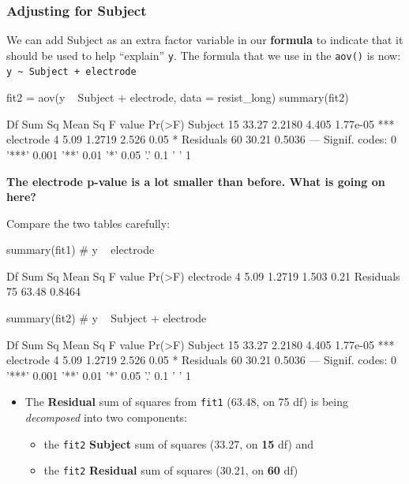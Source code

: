 \documentclass[a4paper]{article}\usepackage[]{graphicx}\usepackage[]{xcolor}
\begin{document}
\subsubsection{Adjusting for \textcolor{myred}{Subject}}
We can add Subject as an extra factor variable in our \textbf{formula} to indicate that it should be used to help ``explain'' \lstinline|y|. The formula that we use in the \lstinline|aov()| is now: \lstinline|y ~ Subject + electrode|
\begin{Schunk}
\begin{Sinput}
fit2 = aov(y ~ Subject + electrode, data = resist_long)
summary(fit2)
\end{Sinput}
\begin{Soutput}
            Df Sum Sq Mean Sq F value   Pr(>F)    
Subject     15  33.27  2.2180   4.405 1.77e-05 ***
electrode    4   5.09  1.2719   2.526     0.05 *  
Residuals   60  30.21  0.5036                     
---
Signif. codes:  0 '***' 0.001 '**' 0.01 '*' 0.05 '.' 0.1 ' ' 1
\end{Soutput}
\end{Schunk}
\begin{greenbox}
	\textbf{The electrode p-value is a lot smaller than before. What is going on here?}
\end{greenbox}
Compare the two tables carefully:
\begin{Schunk}
\begin{Sinput}
summary(fit1) # y ~ electrode
\end{Sinput}
\begin{Soutput}
            Df Sum Sq Mean Sq F value Pr(>F)
electrode    4   5.09  1.2719   1.503   0.21
Residuals   75  63.48  0.8464               
\end{Soutput}
\begin{Sinput}
summary(fit2) # y ~ Subject + electrode
\end{Sinput}
\begin{Soutput}
            Df Sum Sq Mean Sq F value   Pr(>F)    
Subject     15  33.27  2.2180   4.405 1.77e-05 ***
electrode    4   5.09  1.2719   2.526     0.05 *  
Residuals   60  30.21  0.5036                     
---
Signif. codes:  0 '***' 0.001 '**' 0.01 '*' 0.05 '.' 0.1 ' ' 1
\end{Soutput}
\end{Schunk}
\begin{itemize}
	\item The \textbf{Residual} sum of squares from \lstinline|fit1| (63.48, on 75 df) is being \textit{decomposed} into two components:
	\begin{itemize}
		\item the \lstinline|fit2| \textcolor{myred}{\textbf{Subject}} sum of squares (33.27, on \textbf{15} df) and
		\item the \lstinline|fit2| \textbf{Residual} sum of squares (30.21, on \textbf{60} df)
	\end{itemize}
\end{itemize}
\end{document}
